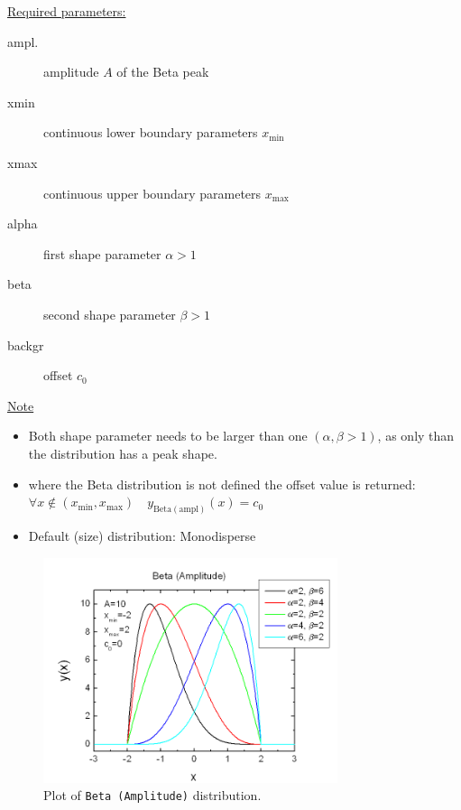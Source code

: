 \underline{Required parameters:}
\begin{description}
    \item[ampl.] amplitude $A$ of the Beta peak
    \item[xmin] continuous lower boundary parameters $x_\mathrm{min}$
    \item[xmax] continuous upper boundary parameters $x_\mathrm{max}$
    \item[alpha] first shape parameter $\alpha>1$
    \item[beta]  second shape parameter $\beta>1$
    \item[backgr] offset $c_0$
\end{description}

\underline{Note}
\begin{itemize}
  \item Both shape parameter needs to be larger than one $(\alpha,\beta>1)$, as only than
  the distribution has a peak shape.
  \item where the Beta distribution is not defined the offset value is returned: \\
  $\forall x\notin (x_\mathrm{min},x_\mathrm{max})\quad y_\mathrm{Beta (ampl)}(x) = c_0$
  \item Default (size) distribution: Monodisperse
\end{itemize}

\begin{figure}[htb]
\begin{center}
\includegraphics[width=0.768\textwidth]{BetaAmplitude.png}
\end{center}
\caption{Plot of \texttt{Beta (Amplitude)} distribution.}
\label{fig:BetaAmplitude}
\end{figure}
\vspace{5mm}

